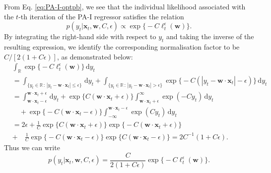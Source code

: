 From Eq. \eqref{eq:PA-I-optpb}, we see that the individual likelihood associated with the $t$-th iteration of the PA-I regressor satisfies the relation
\begin{equation}
	p(y_t|\mathbf{x}_t, \mathbf{w}, C, \epsilon)
	\propto \exp\Big\{-C\ell_t^{\epsilon}(\mathbf{w})\Big\}.
\end{equation}
By integrating the right-hand side with respect to $y_t$ and taking the inverse of the resulting expression, we identify the corresponding normalisation factor to be $C/[2(1+C\epsilon)]$, as demonstrated below:
\begin{align}
	& \int_{\mathbb{R}} \exp\Big\{-C\ell_t^{\epsilon}(\mathbf{w})\Big\}\,\mathrm{d}y_t
	\nonumber \\
	&= \int_{\{y_t \in \mathbb{R} \, : \, |y_t - \mathbf{w}\cdot\mathbf{x}_t| \leq \epsilon\}}\,\mathrm{d}y_t
	+ \int_{\{y_t \in \mathbb{R} \, : \, |y_t - \mathbf{w}\cdot\mathbf{x}_t| > \epsilon\}}
	\exp\Big\{-C(|y_t - \mathbf{w}\cdot\mathbf{x}_t| - \epsilon)\Big\}\,\mathrm{d}y_t
	\nonumber \\
	&= \int_{\mathbf{w}\cdot\mathbf{x}_t - \epsilon}^{\mathbf{w}\cdot\mathbf{x}_t + \epsilon}\,\mathrm{d}y_t
	+ \exp\Big\{C(\mathbf{w}\cdot\mathbf{x}_t + \epsilon)\Big\} \int_{\mathbf{w}\cdot\mathbf{x}_t + \epsilon}^{\infty}
	\exp(-C y_t)\,\mathrm{d}y_t
	\nonumber \\
	& \quad + \exp\Big\{-C(\mathbf{w}\cdot\mathbf{x}_t - \epsilon)\Big\} \int_{-\infty}^{\mathbf{w}\cdot\mathbf{x}_t - \epsilon}
	\exp(C y_t)\,\mathrm{d}y_t
	\nonumber \\
	&= 2\epsilon + \frac{1}{C}\exp\Big\{C(\mathbf{w}\cdot\mathbf{x}_t + \epsilon)\Big\}\exp\Big\{-C(\mathbf{w}\cdot\mathbf{x}_t + \epsilon)\Big\}
	\nonumber \\
	&+ \quad \frac{1}{C}\exp\Big\{-C(\mathbf{w}\cdot\mathbf{x}_t - \epsilon)\Big\}\exp\Big\{C(\mathbf{w}\cdot\mathbf{x}_t - \epsilon)\Big\}
	= 2C^{-1}(1 + C\epsilon).
\end{align}
Thus we can write
\begin{equation}
\label{eq:ilf-likelihood}
	p(y_{t}|\mathbf{x}_{t}, \mathbf{w}, C, \epsilon)
	= \frac{C}{2(1+C\epsilon)}\exp\Big\{-C\ell_t^{\epsilon}(\mathbf{w})\Big\}.
\end{equation}

